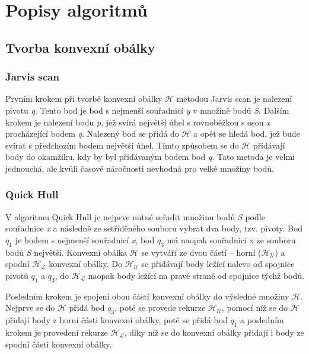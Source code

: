 \documentclass[11pt]{article}
\begin{document}
	
	\section{Popisy algoritmů}
	\subsection{Tvorba konvexní obálky}
	\subsubsection{Jarvis scan}
	
	Prvním krokem při tvorbě konvexní obálky $\mathcal{H}$ metodou Jarvis scan je nalezení pivotu \textit{q}. Tento bod je bod s nejmenší souřadnicí \textit{y} v množině bodů \textit{S}. Dalším krokem je nalezení bodu \textit{p}, jež svírá největší úhel s rovnoběžkou s osou \textit{x} procházející bodem \textit{q}. Nalezený bod se přidá do $\mathcal{H}$ a opět se hledá bod, jež bude svírat s předchozím bodem největší úhel. Tímto způsobem se do $\mathcal{H}$ přidávají body do okamžiku, kdy by byl přidávaným bodem bod \textit{q}. Tato metoda je velmi jednouchá, ale kvůli časové náročnosti nevhodná pro velké množiny bodů.
	
	\subsubsection{Quick Hull}
	
	V algoritmu Quick Hull je nejprve nutné seřadit množinu bodů \textit{S} podle souřadnice \textit{x} a následně ze setříděného souboru vybrat dva body, tzv. pivoty. Bod \textit{$ q_{1} $} je bodem s nejmenší souřadnicí \textit{x}, bod \textit{$ q_3 $} má naopak souřadnici x ze souboru bodů \textit{S} největší. Konvexní obálka $\mathcal{H}$ se vytváří ze dvou částí – horní ($\mathcal{H_U}$) a spodní $\mathcal{H_L}$ konvexní obálky. 
	Do $\mathcal{H_U}$ se přidávají body ležící nalevo od spojnice pivotů \textit{$ q_{1} $} a \textit{$ q_{3} $}, do $\mathcal{H_L}$ naopak body ležící na pravé straně od spojnice týchž bodů.
	
	Posledním krokem je spojení obou částí konvexní obálky do výsledné množiny $\mathcal{H}$. Nejprve se do $\mathcal{H}$ přidá bod \textit{$ q_3 $}, poté se provede rekurze $\mathcal{H_U}$, pomocí níž se do $\mathcal{H}$ přidají body z horní části konvexní obálky, poté se přidá bod \textit{$ q_{1} $} a posledním krokem je provedení rekurze $\mathcal{H_L}$, díky níž se do konvexní obálky přidají i body ze spodní části konvexní obálky.
	
\end{document}
